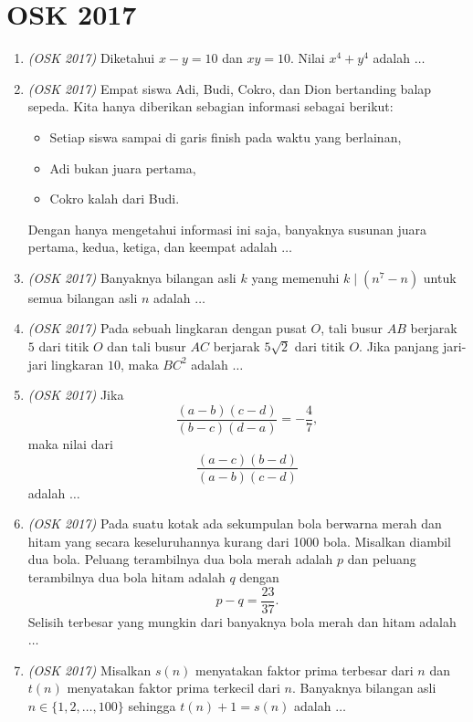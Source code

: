 \newpage
\section{OSK 2017}

\begin{enumerate}
	\item \textit{(OSK 2017)}  Diketahui $x - y = 10$ dan $xy = 10$. Nilai $x^4 + y^4$ adalah $\dots$
	
	\item \textit{(OSK 2017)}  Empat siswa Adi, Budi, Cokro, dan Dion bertanding balap sepeda. Kita hanya diberikan sebagian informasi sebagai berikut:
	\begin{itemize}
		\item Setiap siswa sampai di garis finish pada waktu yang berlainan,
		\item Adi bukan juara pertama,
		\item Cokro kalah dari Budi.
	\end{itemize}
	Dengan hanya mengetahui informasi ini saja, banyaknya susunan juara pertama, kedua, ketiga, dan keempat adalah $\dots$
	
	\item \textit{(OSK 2017)}  Banyaknya bilangan asli $k$ yang memenuhi $k \mid (n^7 - n)$ untuk semua bilangan asli $n$ adalah $\dots$
	
	\item \textit{(OSK 2017)}  Pada sebuah lingkaran dengan pusat $O$, tali busur $AB$ berjarak $5$ dari titik $O$ dan tali busur $AC$ berjarak $5\sqrt{2}$ dari titik $O$. Jika panjang jari-jari lingkaran $10$, maka $BC^2$ adalah $\dots$
	
	\item \textit{(OSK 2017)}  Jika 
	\[
	\frac{(a - b)(c - d)}{(b - c)(d - a)} = -\frac{4}{7},
	\]
	maka nilai dari 
	\[
	\frac{(a - c)(b - d)}{(a - b)(c - d)}
	\]
	adalah $\dots$
	
	\item \textit{(OSK 2017)}  Pada suatu kotak ada sekumpulan bola berwarna merah dan hitam yang secara keseluruhannya kurang dari 1000 bola. Misalkan diambil dua bola. Peluang terambilnya dua bola merah adalah $p$ dan peluang terambilnya dua bola hitam adalah $q$ dengan
	\[
	p - q = \frac{23}{37}.
	\]
	Selisih terbesar yang mungkin dari banyaknya bola merah dan hitam adalah $\dots$
	
	\item \textit{(OSK 2017)}  Misalkan $s(n)$ menyatakan faktor prima terbesar dari $n$ dan $t(n)$ menyatakan faktor prima terkecil dari $n$. Banyaknya bilangan asli $n \in \{1, 2, \dots, 100\}$ sehingga $t(n) + 1 = s(n)$ adalah $\dots$
	

\end{enumerate}
